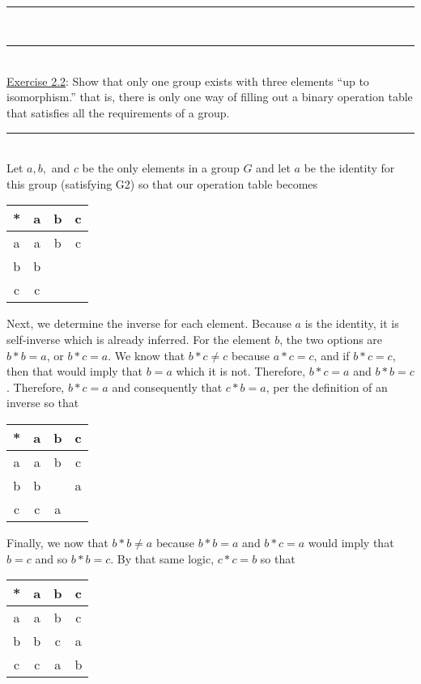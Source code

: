 \documentclass{article}
\newcommand{\problemsep}{\leavevmode\\[0.05in] \rule[\baselineskip/4]{\textwidth}{1pt} \\[0.005in] \rule[\baselineskip]{\textwidth}{1pt}\vspace{-\baselineskip}\leavevmode\\[0.05in]}
\newcommand{\statementsep}{\leavevmode\\[0.005in] \rule[\baselineskip/4]{\textwidth}{0.4pt}\leavevmode\\[0.005in]}
\begin{document}
\problemsep
\noindent\underline{Exercise 2.2}: 
Show that only one group exists with three elements ``up to isomorphism.'' that is, there is only one way of filling out a binary operation table that satisfies all the requirements of a group.
\statementsep
Let $a, b, $ and $c$ be the only elements in a group $G$ and let $a$ be the identity for this group (satisfying G2) so that our operation table becomes
\begin{center}\begin{tabular}{c | c c c}
	* & a & b & c \\ \hline
  a & a & b & c \\
  b & b &   &   \\
  c & c &   &   \\
\end{tabular} \end{center}
Next, we determine the inverse for each element. Because $a$ is the identity, it is self-inverse which is already inferred. For the element $b$, the two options are $b*b = a$, or $b*c = a$. We know that $b*c \ne c$ because $a*c = c$, and if $b*c = c$, then that would imply that $b = a$ which it is not. Therefore, $b*c = a$ and $b*b = c$. Therefore, $b*c = a$ and consequently that $c*b = a$, per the definition of an inverse so that
\begin{center}\begin{tabular}{c | c c c}
	* & a & b & c \\ \hline
  a & a & b & c \\
  b & b &   & a \\
  c & c & a &   \\
\end{tabular} \end{center}
Finally, we now that $b*b \ne a$ because $b*b = a$ and $b*c = a$ would imply that $b = c$ and so $b*b = c$. By that same logic, $c*c = b$ so that
\begin{center}\begin{tabular}{c | c c c}
	* & a & b & c \\ \hline
  a & a & b & c \\
  b & b & c & a \\
  c & c & a & b \\
\end{tabular} \end{center}
\end{document}
